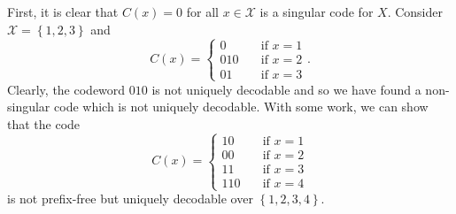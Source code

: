 \documentclass[math]{amznotes}
\theoremstyle{remark}
\begin{document}
First, it is clear that $C\left(x\right) = 0$ for all $x \in \mathcal{X}$ is a singular code for $X$. Consider $\mathcal{X} = \left\{1, 2, 3\right\}$ and 
\begin{equation*}
    C\left(x\right) = \begin{cases}
        0 & \quad\textrm{if } x = 1 \\
        010 & \quad\textrm{if } x = 2 \\
        01 & \quad\textrm{if } x = 3
    \end{cases}.
\end{equation*}
Clearly, the codeword $010$ is not uniquely decodable and so we have found a non-singular code which is not uniquely decodable. With some work, we can show that the code 
\begin{equation*}
    C\left(x\right) = \begin{cases}
        10 & \quad\textrm{if } x = 1 \\
        00 & \quad\textrm{if } x = 2 \\
        11 & \quad\textrm{if } x = 3 \\
        110 & \quad\textrm{if } x = 4
    \end{cases}
\end{equation*}
is not prefix-free but uniquely decodable over $\left\{1, 2, 3, 4\right\}$.
\end{document}
